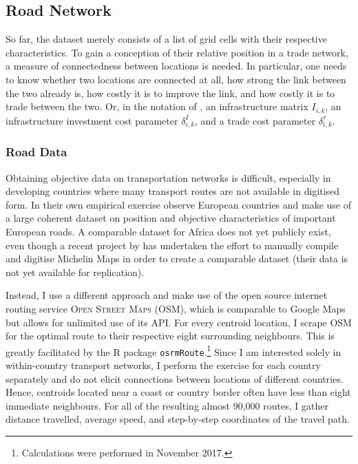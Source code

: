 \documentclass[11pt, oneside]{article}   	%
\begin{document}
\subsection{Road Network}
So far, the dataset merely consists of a list of grid cells with their respective characteristics. To gain a conception of their relative position in a trade network, a measure of connectedness between locations is needed. In particular, one needs to know whether two locations are connected at all, how strong the link between the two already is, how costly it is to improve the link, and how costly it is to trade between the two. Or, in the notation of \cite{fajgelbaum_optimal_2017}, an infrastructure matrix $I_{i,k}$, an infrastructure investment cost parameter $\delta_{i,k}^{I}$, and a trade cost parameter $\delta_{i,k}^{\tau}$.

\subsubsection{Road Data}
Obtaining objective data on transportation networks is difficult, especially in developing countries where many transport routes are not available in digitised form. In their own empirical exercise \citeauthor{fajgelbaum_optimal_2017} observe European countries and make use of a large coherent dataset on position and objective characteristics of important European roads. A comparable dataset for Africa does not yet publicly exist, even though a recent project by \cite{jedwab_average_2017} has undertaken the effort to manually compile and digitise Michelin Maps in order to create a comparable dataset (their data is not yet available for replication).

Instead, I use a different approach and make use of the open source internet routing service \textsc{Open Street Maps} (OSM), which is comparable to Google Maps but allows for unlimited use of its API. For every centroid location, I scrape OSM for the optimal route to their respective eight surrounding neighbours. This is greatly facilitated by the R package \texttt{osrmRoute}.\footnote{Calculations were performed in November 2017.} Since I am interested solely in within-country transport networks, I perform the exercise for each country separately and do not elicit connections between locations of different countries. Hence, centroids located near a coast or country border often have less than eight immediate neighbours. For all of the resulting almost 90,000 routes, I gather distance travelled, average speed, and step-by-step coordinates of the travel path.
\end{document}
